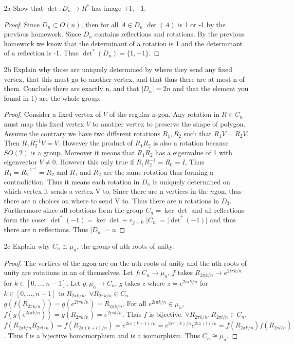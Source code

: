\documentclass{article}
\newcommand{\abs}[1]{\lvert #1\rvert}
\begin{document}
\bigskip

\begin{claim}{2a}
    Show that $\det: D_n \to R^*$ has image ${+1,-1}$. 
\end{claim}
\begin{proof}
    Since $D_n \subset O(n)$, then for all $A \in D_n$ $\det(A)$ is 1 or -1 by the previous homework. Since $D_n$ contains reflections and rotations. By the previous homework we know that the determinant of a rotation is 1 and the determinant of a reflection is -1. Thus $\det^*(D_n) = \{1, -1\}$.
\end{proof}

\begin{claim}{2b}
    Explain why these are uniquely determined by where they send any fixed vertex, that this must go to another vertex, and that thus there are at most n of them. Conclude there are exactly n, and that $\abs{D_n} = 2n$ and that the element you found in 1) are the whole group. 
\end{claim}
\begin{proof}
    Consider a fixed vertex of $V$ of the regular n-gon. Any rotation in $R \in C_n$ must map this fixed vertex $V$ to another vertex to preserve the shape of polygon. Assume the contrary we have two different rotations $R_1, R_2$ such that $R_1V = R_2V$. Then $R_1R_2^{-1}V = V$. However the product of $R_1R_2$ is also a rotation because $SO(2)$ is a group. Moreover it means that $R_1R_2$ has a eigenvalue of 1 with eigenvector $V \neq 0$. However this only true if $R_1R_2^{-1} = R_0 = I$, Thus $R_1 = R_2^{-1^{-1}} = R_2$ and $R_1$ and $R_2$ are the same rotation thus forming a contradiction. Thus it means each rotation in $D_n$ is uniquely determined on which vertex it sends a vertex V to. Since there are n vertices in the $n$gon, thus there are n choices on where to send V to. Thus there are n rotations in $D_3$. Furthermore since all rotations form the group $C_n = \ker \det$ and all reflections form the coset $\det^*(-1) = \ker \det + r_{y=0}$ $\abs{C_n} = \abs{\det^*(-1)}$ and thus there are n reflections. Thus $\abs{D_n} = n$
\end{proof}

\begin{claim}{2c}
    Explain why $C_n \cong \mu_n$, the group of nth roots of unity. 
\end{claim}
\begin{proof}
    The vertices of the ngon are on the nth roots of unity and the nth roots of unity are rotations in an of themselves. Let $f: C_n \to \mu_n$, $f$ takes $R_{2 \pi k/n} \to e^{2i \pi k/n}$ for $k \in [0, \ldots, n - 1]$. Let $g: \mu_n \to C_n$, $g$ takes $z$ where $z = e^{2i \pi k/n}$ for $k \in [0, \ldots, n - 1]$ to $R_{2 \pi k/n}$. $\forall R_{2 \pi k/n} \in C_n$ $g(f(R_{2 \pi k/n} )) = g(e^{2 i\pi k/n}) = R_{2 \pi k/n}$. For all $e^{2i \pi k/n} \in \mu_n$, $f(g(e^{2i \pi k/n})) = g(R_{2 \pi k/n}) = e^{2i \pi k/n}$. Thus $f$ is bijective. $\forall R_{2 \pi k/n},R_{2 \pi l/n} \in C_n$, $f(R_{2 \pi k/n}R_{2 \pi l/n}) = f(R_{2 \pi (k+l)/n}) = e^{2i \pi (k+l)/n} =  e^{2i \pi (k)/n} e^{2i \pi (l)/n} = f(R_{2 \pi k/n})f(R_{2 \pi l/n})$. Thus f is a bijective homomorphism and is a isomorphism. Thus $C_n \cong \mu_n$.
\end{proof}
\end{document}
